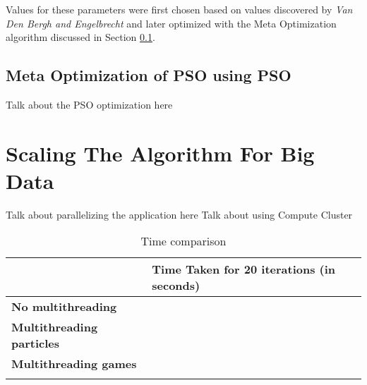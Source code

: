 \documentclass[12pt]{article}
\numberwithin{table}{section}
\begin{document}
Values for these parameters were first chosen based on values discovered by \emph{Van Den Bergh and Engelbrecht} \cite{VanDenBergh2006ATrajectories} and later optimized with the Meta Optimization algorithm discussed in Section \ref{meta-opt}.

\subsection{Meta Optimization of PSO using PSO}\label{meta-opt}
Talk about the PSO optimization here

\section{Scaling The Algorithm For Big Data}
Talk about parallelizing the application here
Talk about using Compute Cluster

\begin{longtable}[H]{|l|l|}
\hline
                         			& \textbf{Time Taken for 20 iterations (in seconds)} \\ \hline
\textbf{No multithreading}			&                                           \\ \hline
\textbf{Multithreading particles} 	&                                           \\ \hline
\textbf{Multithreading games} 		&                                           \\ \hline
\caption{Time comparison}
\label{multithread-comp-table}
\end{longtable}
\end{document}
